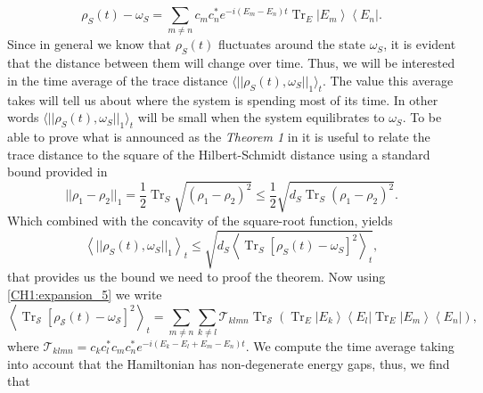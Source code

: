 \begin{equation}
\rho_{S}(t)-\omega_{S}=\sum_{m \neq n} c_{m} c_{n}^{*} e^{-i\left(E_{m}-E_{n}\right) t} \operatorname{Tr}_{E}\left|E_{m}\right\rangle\left\langle E_{n}\right|.
\label{CH1:expansion_5}
\end{equation}
Since in general we know that $\rho_S(t)$ fluctuates around the state $\omega_S$, it is evident that the distance between them will change over time. Thus, we will be interested in the time average of the trace distance $\langle ||\rho_{S}(t), \omega_{S}||_1\rangle_t$. The value this average takes will tell us about where the system is spending most of its time. In other words $\langle ||\rho_{S}(t), \omega_{S}||_1\rangle_t$ will be small when the system equilibrates to $\omega_S$. To be able to prove what is announced as the \textit{Theorem 1} in \cite{linden_quantum_2009} it is useful to relate the trace distance to the square of the Hilbert-Schmidt distance using a standard bound provided in \cite{fuchs_cryptographic_1999}
\begin{equation}
||\rho_{1}-\rho_{2}||_1=\frac{1}{2} \operatorname{Tr}_{S} \sqrt{\left(\rho_{1}-\rho_{2}\right)^{2}} \leq \frac{1}{2} \sqrt{d_{S} \operatorname{Tr}_{S}\left(\rho_{1}-\rho_{2}\right)^{2}}.
\label{CH1:Linden_proof_1}
\end{equation}
Which combined with the concavity of the square-root function, yields
\begin{equation}
\left\langle ||\rho_{S}(t), \omega_{S}||_1\right\rangle_{t} \leq \sqrt{d_{S}\left\langle\operatorname{Tr}_{S}\left[\rho_{S}(t)-\omega_{S}\right]^{2}\right\rangle_{t}},
\label{CH1:Linden_proof_2}
\end{equation}
that provides us the bound we need to proof the theorem. Now using \eqref{CH1:expansion_5} we write
\begin{equation}
\left\langle\operatorname{Tr}_{\mathcal{S}}\left[\rho_{\mathcal{S}}(t)-\omega_{\mathcal{S}}\right]^{2}\right\rangle_{t}=\sum_{m \neq n} \sum_{k \neq l} \mathcal{T}_{k l m n} \operatorname{Tr}_{\mathcal{S}}\left(\operatorname{Tr}_{E}\left|E_{k}\right\rangle\left\langle E_{l}\left|\operatorname{Tr}_{E}\right| E_{m}\right\rangle\left\langle E_{n}\right|\right),
\end{equation}
where $\mathcal{T}_{k l m n}=c_{k} c_{l}^{*} c_{m} c_{n}^{*} e^{-i\left(E_{k}-E_{l}+E_{m}-E_{n}\right) t}$. We compute the time average taking into account that the Hamiltonian has non-degenerate energy gaps, thus, we find that

